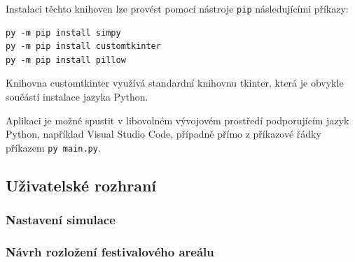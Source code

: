 \documentclass[12pt,a4paper]{article}
\begin{document}
Instalaci těchto knihoven lze provést pomocí nástroje \texttt{pip} následujícími příkazy:

\begin{verbatim}
py -m pip install simpy
py -m pip install customtkinter
py -m pip install pillow
\end{verbatim}

Knihovna customtkinter využívá standardní knihovnu tkinter, která je obvykle součástí instalace jazyka Python.

Aplikaci je možné spustit v libovolném vývojovém prostředí podporujícím jazyk Python, například Visual Studio Code, případně přímo z příkazové řádky příkazem \texttt{py main.py}.

\subsection{Uživatelské rozhraní}
\subsubsection{Nastavení simulace}
\subsubsection{Návrh rozložení festivalového areálu}
\end{document}
